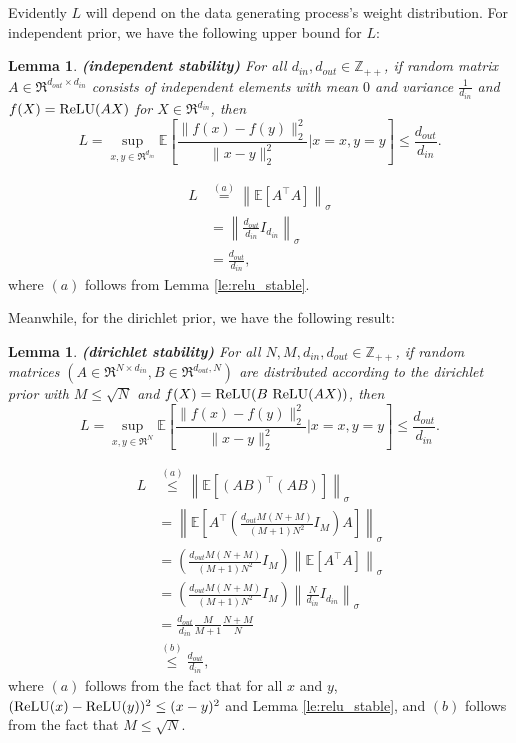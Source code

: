\documentclass[twoside,11pt]{article}
\renewenvironment{proof}{\par\noindent{\bf Proof\ }}{\hfill\BlackBox\\[2mm]}
\newenvironment{proof}{\par\noindent{\bf Proof\ }}{\hfill\BlackBox\\[2mm]}
\newtheorem{lemma}[theorem]{Lemma}
\def\relu{{\rm ReLU}}
\def\E{\mathbb{E}}
\begin{document}
Evidently $L$ will depend on the data generating process's weight distribution. For independent prior, we have the following upper bound for $L$:

\begin{lemma}{\bf (independent stability)}
    \label{le:indep_stable}
    For all $d_{in}, d_{out}\in\mathbb{Z}_{++}$, if random matrix $A\in\Re^{d_{out}\times d_{in}}$ consists of independent elements with mean $0$ and variance $\frac{1}{d_{in}}$ and $f(X) = \relu(AX)$ for $X \in \Re^{d_{in}}$, then
    $$ L = \sup_{x,y\in\Re^{d_{in}}}\E\left[\frac{\|f(x)-f(y)\|^2_2}{\|x-y\|^2_2}\Big|x=x, y=y\right] \leq \frac{d_{out}}{d_{in}}.$$
\end{lemma}
\begin{proof}
    \begin{align*}
        L
        & \overset{(a)}{=} \left\|\E\left[A^{\top}A\right]\right\|_\sigma\\
        & = \left\|\frac{d_{out}}{d_{in}}I_{d_{in}}\right\|_\sigma\\
        & = \frac{d_{out}}{d_{in}},
    \end{align*}
    where $(a)$ follows from Lemma \ref{le:relu_stable}.
\end{proof}

Meanwhile, for the dirichlet prior, we have the following result:

\begin{lemma}{\bf (dirichlet stability)}
    \label{le:nonparam_stable}
    For all $N, M, d_{in}, d_{out}\in\mathbb{Z}_{++}$, if random matrices $(A\in\Re^{N\times d_{in}}, B\in\Re^{d_{out}, N})$ are distributed according to the dirichlet prior with $M \leq \sqrt{N}$ and $f(X) = \relu(B\ \relu(AX))$, then
    $$ L = \sup_{x,y\in\Re^{N}}\E\left[\frac{\|f(x)-f(y)\|^2_2}{\|x-y\|^2_2}\Big|x=x, y=y\right] \leq \frac{d_{out}}{d_{in}}.$$
\end{lemma}
\begin{proof}
    \begin{align*}
        L
        & \overset{(a)}{\leq} \left\|\E\left[(AB)^{\top}(AB)\right]\right\|_\sigma\\
        & \overset{}{=} \left\|\E\left[A^{\top}\left(\frac{d_{out}M(N+M)}{(M+1)N^2}I_{M}\right)A\right]\right\|_\sigma\\
        & \overset{}{=} \left(\frac{d_{out}M(N+M)}{(M+1)N^2}I_{M}\right)\left\|\E\left[A^\top A\right]\right\|_\sigma\\
        & \overset{}{=} \left(\frac{d_{out}M(N+M)}{(M+1)N^2}I_{M}\right)\left\|\frac{N}{d_{in}}I_{d_{in}}\right\|_\sigma\\
        & = \frac{d_{out}}{d_{in}}\frac{M}{M+1}\frac{N+M}{N}\\
        & \overset{(b)}{\leq} \frac{d_{out}}{d_{in}},
    \end{align*}
    where $(a)$ follows from the fact that for all $x$ and $y$, $(\relu(x) - \relu(y))^2\leq (x-y)^2$ and Lemma \ref{le:relu_stable}, and $(b)$ follows from the fact that $M \leq \sqrt{N}$.
\end{proof}
\end{document}
